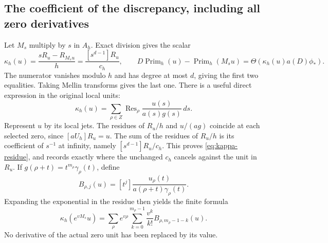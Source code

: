 \documentclass[11pt]{article}
\DeclareMathOperator{\Res}{Res}
\newcommand{\PP}{\operatorname{Prim}_h}
\newcommand{\dd}{\,d}
\begin{document}
\subsection{The coefficient of the discrepancy, including all zero derivatives}
Let $M_s$ multiply by $s$ in $A_h$. Exact division gives the scalar
\begin{equation}
 \kappa_h(u)=\frac{sR_u-R_{M_su}}{h}
            =\frac{[s^{d-1}]R_u}{c_h},\qquad
 D\PP(u)-\PP(M_su)=\Theta(\kappa_h(u)a(D)\phi_*).
 \label{eq:kappa}
\end{equation}
The numerator vanishes modulo $h$ and has degree at most $d$, giving
the first two equalities. Taking Mellin transforms gives the last one.
There is a useful direct expression in the original local units:
\begin{equation}
 \kappa_h(u)=\sum_{\rho\in Z}\Res_\rho
                     \frac{u(s)}{a(s)g(s)}\dd s.\label{eq:kappa-residue}
\end{equation}
Represent $u$ by its local jets. The residues of $R_u/h$ and
$u/(ag)$ coincide at each selected zero, since $[aU_h]R_u=u$.
The sum of the residues of $R_u/h$ is its coefficient of $s^{-1}$
at infinity, namely $[s^{d-1}]R_u/c_h$.
This proves \eqref{eq:kappa-residue}, and records exactly where the
unchanged $c_h$ cancels against the unit in $R_u$.
If $g(\rho+t)=t^{m_\rho}\gamma_\rho(t)$, define
\begin{equation}
 B_{\rho,j}(u)=[t^j]\frac{u_\rho(t)}{a(\rho+t)\gamma_\rho(t)}.
\end{equation}
Expanding the exponential in the residue then yields the finite formula
\begin{equation}
 \kappa_h(e^{vM_s}u)=\sum_\rho e^{v\rho}
       \sum_{k=0}^{m_\rho-1}\frac{v^k}{k!}B_{\rho,m_\rho-1-k}(u).
 \label{eq:kappa-exp}
\end{equation}
No derivative of the actual zero unit has been replaced by its value.
\end{document}
